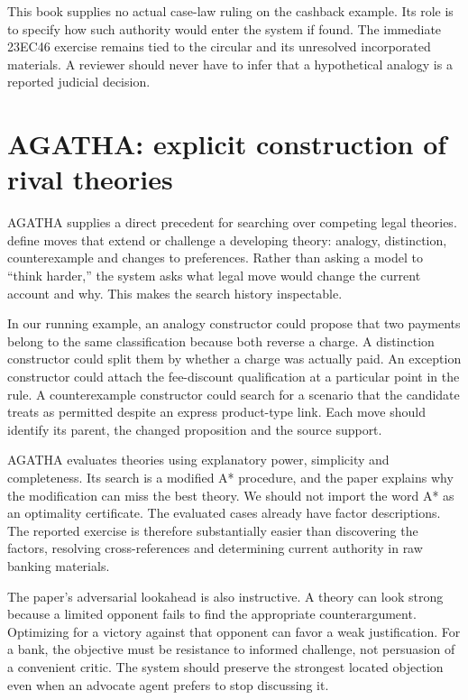 This book supplies no actual case-law ruling on the cashback example. Its role is
to specify how such authority would enter the system if found. The immediate
23EC46 exercise remains tied to the circular and its unresolved incorporated
materials. A reviewer should never have to infer that a hypothetical analogy is
a reported judicial decision.

\section{AGATHA: explicit construction of rival theories}

AGATHA supplies a direct precedent for searching over competing legal theories.
\citet[sections 2--4]{agatha2005} define moves that extend or challenge a developing
theory: analogy, distinction, counterexample and changes to preferences. Rather
than asking a model to ``think harder,'' the system asks what legal move would
change the current account and why. This makes the search history inspectable.

In our running example, an analogy constructor could propose that two payments
belong to the same classification because both reverse a charge. A distinction
constructor could split them by whether a charge was actually paid. An exception
constructor could attach the fee-discount qualification at a particular point in
the rule. A counterexample constructor could search for a scenario that the
candidate treats as permitted despite an express product-type link. Each move
should identify its parent, the changed proposition and the source support.

AGATHA evaluates theories using explanatory power, simplicity and completeness.
Its search is a modified A* procedure, and the paper explains why the modification
can miss the best theory. We should not import the word A* as an optimality
certificate. The evaluated cases already have factor descriptions. The reported
exercise is therefore substantially easier than discovering the factors,
resolving cross-references and determining current authority in raw banking
materials.

The paper's adversarial lookahead is also instructive. A theory can look strong
because a limited opponent fails to find the appropriate counterargument.
Optimizing for a victory against that opponent can favor a weak justification.
For a bank, the objective must be resistance to informed challenge, not persuasion
of a convenient critic. The system should preserve the strongest located
objection even when an advocate agent prefers to stop discussing it.

